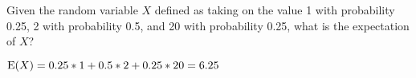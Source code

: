 \question Given the random variable $X$ defined as taking on the value 
1 with probability 0.25, 2 with probability 0.5, and 20 with probability 
0.25, what is the expectation of $X$?
\begin{solution}[1cm]
$\text{E}(X) = 0.25*1 + 0.5*2 + 0.25*20 = 6.25$ \\ 
\end{solution}
